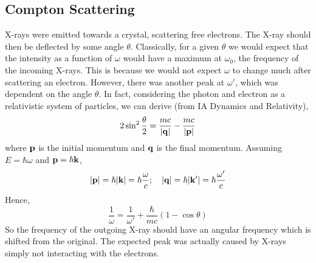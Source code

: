 \subsection{Compton Scattering}
X-rays were emitted towards a crystal, scattering free electrons.
The X-ray should then be deflected by some angle \( \theta \).
Classically, for a given \( \theta \) we would expect that the intensity as a function of \( \omega \) would have a maximum at \( \omega_0 \), the frequency of the incoming X-rays.
This is because we would not expect \( \omega \) to change much after scattering an electron.
However, there was another peak at \( \omega' \), which was dependent on the angle \( \theta \).
In fact, considering the photon and electron as a relativistic system of particles, we can derive (from IA Dynamics and Relativity),
\[ 2 \sin^2 \frac{\theta}{2} = \frac{mc}{\abs{\vb q}} - \frac{mc}{\abs{\vb p}} \]
where \( \vb p \) is the initial momentum and \( \vb q \) is the final momentum.
Assuming \( E = \hbar \omega \) and \( \vb p = \hbar \vb k \),
\[ \abs{\vb p} = \hbar \abs{\vb k} = \hbar \frac{\omega}{c};\quad \abs{\vb q} = \hbar \abs{\vb k'} = \hbar\frac{\omega'}{c} \]
Hence,
\[ \frac{1}{\omega} = \frac{1}{\omega'} + \frac{\hbar}{mc}(1-\cos\theta) \]
So the frequency of the outgoing X-ray should have an angular frequency which is shifted from the original.
The expected peak was actually caused by X-rays simply not interacting with the electrons.

